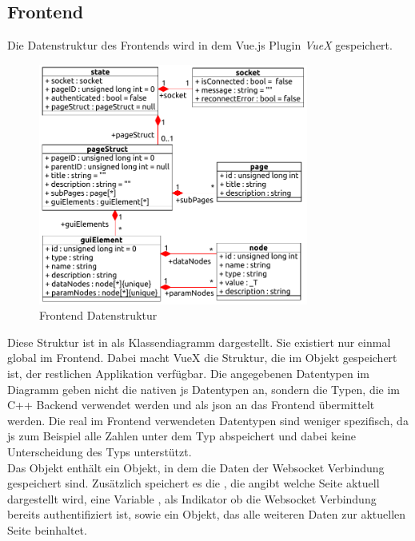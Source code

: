 \subsection{Frontend}\label{subsec:dataFrontend}
Die Datenstruktur des Frontends wird in dem Vue.js Plugin \emph{VueX} gespeichert.
\begin{figure}[htb]
  \centering
  \includegraphics[width=0.79\textwidth]{content/hauptteil/systemEntwurf/res/structureFrontend.pdf}
  \caption[Frontend Datenstruktur]{Frontend Datenstruktur}
  \label{fig:structFrontendState}
\end{figure}
Diese Struktur ist in  als Klassendiagramm dargestellt. Sie existiert nur einmal global im Frontend.
Dabei macht VueX die Struktur, die im  Objekt gespeichert ist, der restlichen Applikation verfügbar.
Die angegebenen Datentypen im Diagramm geben nicht die nativen \acl{js} Datentypen an, sondern die Typen, 
die im C++ Backend verwendet werden und als \ac{json} an das Frontend übermittelt werden.
Die real im Frontend verwendeten Datentypen sind weniger spezifisch, 
da \acl{js} zum Beispiel alle Zahlen unter dem Typ  abspeichert und dabei keine Unterscheidung des Typs unterstützt.
\\Das {} Objekt enthält ein  Objekt, in dem die Daten der Websocket Verbindung gespeichert sind.
Zusätzlich speichert es die , die angibt welche Seite aktuell dargestellt wird, eine Variable , 
als Indikator ob die Websocket Verbindung bereits authentifiziert ist, sowie ein  Objekt, das alle weiteren Daten zur aktuellen Seite beinhaltet.
